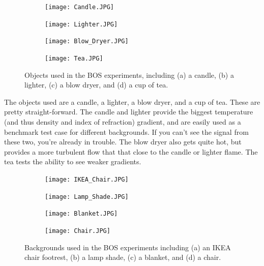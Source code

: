 \documentclass[letterpaper,12pt]{article}
\begin{document}
\begin{figure}[h]
    \centering
    \begin{subfigure}[b]{0.23\textwidth}
    	\centering
        \texttt{[image: Candle.JPG]}
        \caption{}
        \label{fig:Candle}
    \end{subfigure}
    \begin{subfigure}[b]{0.23\textwidth}
    	\centering
        \texttt{[image: Lighter.JPG]}
        \caption{}
        \label{fig:Lighter}
    \end{subfigure}
    \begin{subfigure}[b]{0.23\textwidth}
    	\centering
        \texttt{[image: Blow\_Dryer.JPG]}
        \caption{}
        \label{fig:Blow_Dryer}
    \end{subfigure}
    \begin{subfigure}[b]{0.23\textwidth}
    	\centering
        \texttt{[image: Tea.JPG]}
        \caption{}
        \label{fig:Tea}
    \end{subfigure}
    
    \caption{Objects used in the BOS experiments, including (a) a candle, (b) a lighter, (c) a blow dryer, and (d) a cup of tea.}
    \label{fig:Objects}
\end{figure}

The objects used are a candle, a lighter, a blow dryer, and a cup of tea.  These are pretty straight-forward.  The candle and lighter provide the biggest temperature (and thus density and index of refraction) gradient, and are easily used as a benchmark test case for different backgrounds.  If you can't see the signal from these two, you're already in trouble.  The blow dryer also gets quite hot, but provides a more turbulent flow that that close to the candle or lighter flame.  The tea tests the ability to see weaker gradients.

\begin{figure}[h]
    \centering
    \begin{subfigure}[b]{0.23\textwidth}
    	\centering
        \texttt{[image: IKEA\_Chair.JPG]}
        \caption{}
        \label{fig:IKEA_Chair}
    \end{subfigure}
    \begin{subfigure}[b]{0.23\textwidth}
    	\centering
        \texttt{[image: Lamp\_Shade.JPG]}
        \caption{}
        \label{fig:Lamp_Shade}
    \end{subfigure}
    \begin{subfigure}[b]{0.23\textwidth}
    	\centering
        \texttt{[image: Blanket.JPG]}
        \caption{}
        \label{fig:Blanket}
    \end{subfigure}
    \begin{subfigure}[b]{0.23\textwidth}
    	\centering
        \texttt{[image: Chair.JPG]}
        \caption{}
        \label{fig:Chair}
    \end{subfigure}
    
    \caption{Backgrounds used in the BOS experiments including (a) an IKEA chair footrest, (b) a lamp shade, (c) a blanket, and (d) a chair.}
    \label{fig:Backgrounds}
\end{figure}
\end{document}
